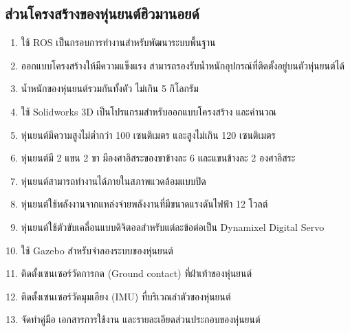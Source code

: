 \subsection{ส่วนโครงสร้างของหุ่นยนต์ฮิวมานอยด์}
\begin{enumerate}[label=\arabic*, leftmargin=1.5cm]
	\item ใช้ ROS เป็นกรอบการทำงานสำหรับพัฒนาระบบพื้นฐาน
	\item ออกแบบโครงสร้างให้มีความแข็งแรง สามารถรองรับน้ำหนักอุปกรณ์ที่ติดตั้งอยู่บนตัวหุ่นยนต์ได้
	\item น้ำหนักของหุ่นยนต์รวมกันทั้งตัว ไม่เกิน 5 กิโลกรัม
	\item ใช้ Solidworks 3D เป็นโปรแกรมสำหรับออกแบบโครงสร้าง และคำนวณ
	\item หุ่นยนต์มีความสูงไม่ต่ำกว่า 100 เซนติเมตร และสูงไม่เกิน 120 เซนติเมตร
	\item หุ่นยนต์มี 2 แขน 2 ขา มีองศาอิสระของขาข้างละ 6 และแขนข้างละ 2 องศาอิสระ
	\item หุ่นยนต์สามารถทำงานได้ภายในสภาพแวดล้อมแบบปิด
	\item หุ่นยนต์ใช้พลังงานจากแหล่งจ่ายพลังงานที่มีขนาดแรงดันไฟฟ้า 12 โวลต์
	\item หุ่นยนต์ใช้ตัวขับเคลื่อนแบบดิจิตอลสำหรับแต่ละข้อต่อเป็น Dynamixel Digital Servo
	\item ใช้ Gazebo สำหรับจำลองระบบของหุ่นยนต์
	\item ติดตั้งเซนเซอร์วัดการกด (Ground contact) ที่ฝ่าเท้าของหุ่นยนต์
	\item ติดตั้งเซนเซอร์วัดมุมเอียง (IMU) ที่บริเวณลำตัวของหุ่นยนต์
	\item จัดทำคู่มือ เอกสารการใช้งาน และรายละเอียดส่วนประกอบของหุ่นยนต์
\end{enumerate}

